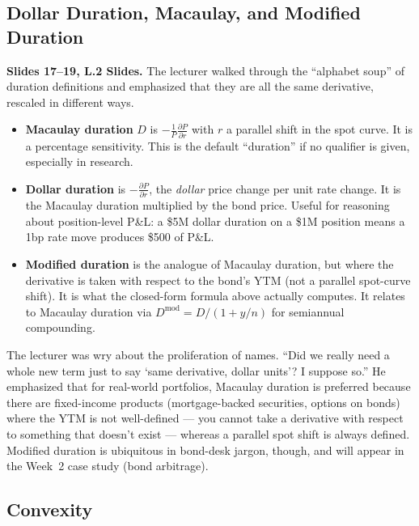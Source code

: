 \subsection{Dollar Duration, Macaulay, and Modified Duration}\label{L2-sec:duration-names}

\textbf{Slides 17--19, L.2 Slides.} The lecturer walked through the
``alphabet soup'' of duration definitions and emphasized that they are all
the same derivative, rescaled in different ways.

\begin{itemize}
  \item \textbf{Macaulay duration} $D$ is
        $-\tfrac{1}{P}\tfrac{\partial P}{\partial r}$
        with $r$ a parallel shift in the spot curve. It is a percentage
        sensitivity. This is the default ``duration'' if no qualifier is
        given, especially in research.
  \item \textbf{Dollar duration} is $-\tfrac{\partial P}{\partial r}$, the
        \emph{dollar} price change per unit rate change. It is the Macaulay
        duration multiplied by the bond price. Useful for reasoning about
        position-level P\&L: a \$5M dollar duration on a \$1M position means
        a 1bp rate move produces \$500 of P\&L.
  \item \textbf{Modified duration} is the analogue of Macaulay duration, but
        where the derivative is taken with respect to the bond's YTM (not a
        parallel spot-curve shift). It is what the closed-form formula above
        actually computes. It relates to Macaulay duration via
        $D^{\text{mod}} = D / (1 + y/n)$ for semiannual compounding.
\end{itemize}

The lecturer was wry about the proliferation of names. ``Did we really need a
whole new term just to say `same derivative, dollar units'? I suppose so.''
He emphasized that for real-world portfolios, Macaulay duration is preferred
because there are fixed-income products (mortgage-backed securities, options
on bonds) where the YTM is not well-defined --- you cannot take a derivative
with respect to something that doesn't exist --- whereas a parallel spot
shift is always defined. Modified duration is ubiquitous in bond-desk jargon,
though, and will appear in the Week~2 case study (bond arbitrage).

\subsection{Convexity}\label{L2-sec:convexity}

